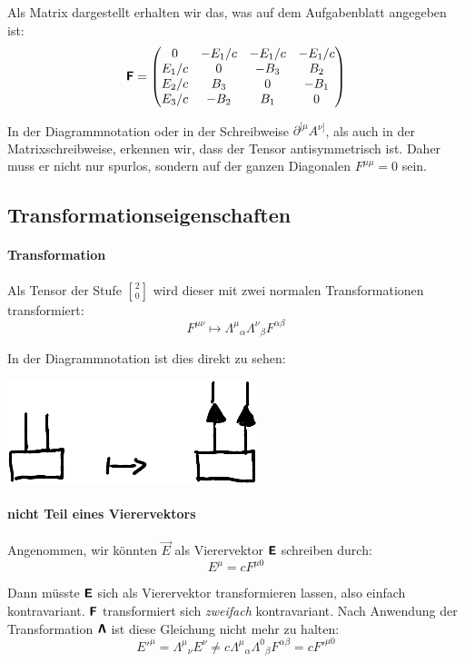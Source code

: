 Als Matrix dargestellt erhalten wir das, was auf dem Aufgabenblatt angegeben
ist:
\[
	\boldsymbol{\mathsf{F}}
	=
	\begin{pmatrix}
		0 & -E_1/c & -E_1/c & -E_1/c \\
		E_1/c & 0 & -B_3 & B_2 \\
		E_2/c & B_3 & 0 & -B_1 \\
		E_3/c & -B_2 & B_1 & 0 \\
	\end{pmatrix}
\]

In der Diagrammnotation oder in der Schreibweise $\partial^{[\mu} A^{\nu]}$, als
auch in der Matrixschreibweise, erkennen wir, dass der Tensor antisymmetrisch
ist. Daher muss er nicht nur spurlos, sondern auf der ganzen Diagonalen
$F^{\mu\mu} = 0$ sein.

\subsection{Transformationseigenschaften}

\paragraph{Transformation}

Als Tensor der Stufe ${2 \brack 0}$ wird dieser mit zwei normalen
Transformationen transformiert:
\[
	F^{\mu\nu} \mapsto \Lambda^\mu{}_\alpha \Lambda^\nu{}_\beta F^{\alpha\beta}
\]

In der Diagrammnotation ist dies direkt zu sehen:
\begin{center}
	\includegraphics{H1-Penrose-9-crop.pdf}
\end{center}

\paragraph{nicht Teil eines Vierervektors}

Angenommen, wir könnten $\vec E$ als Vierervektor $\boldsymbol{\mathsf{E}}$ schreiben durch:
\[
	E^\mu = c F^{\mu0}
\]

Dann müsste $\boldsymbol{\mathsf{E}}$ sich als Vierervektor transformieren lassen, also einfach
kontravariant. $\boldsymbol{\mathsf{F}}$ transformiert sich \emph{zweifach} kontravariant. Nach
Anwendung der Transformation $\boldsymbol{\mathsf{\Lambda}}$ ist diese Gleichung nicht mehr zu
halten:
\[
	E'^\mu
	= \Lambda^\mu{}_\nu E^\nu
	\neq
	c \Lambda^\mu{}_\alpha \Lambda^0{}_\beta F^{\alpha\beta}
	= c F'^{\mu0}
\]

